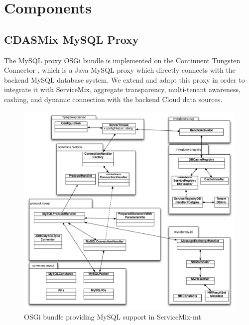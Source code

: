 \chapter{Components}


\section{CDASMix MySQL Proxy}
\label{appendix:cdasmixmysqlproxy}

The MySQL proxy \ac{OSGi} bundle is implemented on the Continuent Tungsten Connector \cite{tungstenwiki}, which is a Java MySQL proxy which directly connects with the backend MySQL database system. We extend and adapt this proxy in order to integrate it with ServiceMix, aggregate transparency, multi-tenant awareness, cashing, and dynamic connection with the backend Cloud data sources.

\begin{figure}[htb]
	\centering
		\includegraphics[clip, scale=0.4]{./gfx/mysql-osgi/mysql-proxy-v3.pdf}
	\caption[ServiceMix-mt MySQL OSGi Bundle]{OSGi bundle providing MySQL support in ServiceMix-mt}
	\label{fig:mysqlclassdiagram}
\end{figure}

